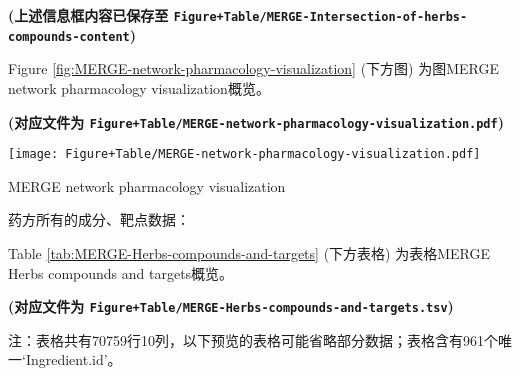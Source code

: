 \documentclass[
]{article}
\begin{document}
\textbf{(上述信息框内容已保存至 \texttt{Figure+Table/MERGE-Intersection-of-herbs-compounds-content})}

Figure \ref{fig:MERGE-network-pharmacology-visualization} (下方图) 为图MERGE network pharmacology visualization概览。

\textbf{(对应文件为 \texttt{Figure+Table/MERGE-network-pharmacology-visualization.pdf})}

\def\@captype{figure}
\begin{center}
\texttt{[image: Figure+Table/MERGE-network-pharmacology-visualization.pdf]}
\caption{MERGE network pharmacology visualization}\label{fig:MERGE-network-pharmacology-visualization}
\end{center}

药方所有的成分、靶点数据：

Table \ref{tab:MERGE-Herbs-compounds-and-targets} (下方表格) 为表格MERGE Herbs compounds and targets概览。

\textbf{(对应文件为 \texttt{Figure+Table/MERGE-Herbs-compounds-and-targets.tsv})}

\begin{center}\begin{tcolorbox}[colback=gray!10, colframe=gray!50, width=0.9\linewidth, arc=1mm, boxrule=0.5pt]注：表格共有70759行10列，以下预览的表格可能省略部分数据；表格含有961个唯一`Ingredient.id'。
\end{tcolorbox}
\end{center}
\end{document}
